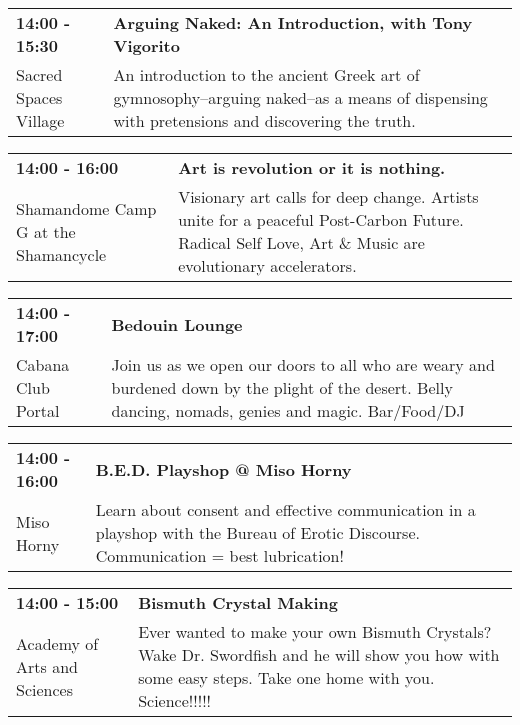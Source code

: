 \begin{tabular}{ p{1in} p{2.2in} }
    \textbf{14:00 - 15:30} & \textbf{Arguing Naked: An Introduction, with Tony Vigorito} \\
    Sacred Spaces Village \newline  & An introduction to the ancient Greek art of gymnosophy--arguing naked--as a means of dispensing with pretensions and discovering the truth. \\
    \hline 
\end{tabular}
    
\begin{tabular}{ p{1in} p{2.2in} }
    \textbf{14:00 - 16:00} & \textbf{Art is revolution or it is nothing.} \\
    Shamandome Camp \newline 615 G at the Shamancycle & Visionary art calls for deep change.  Artists unite for a peaceful Post-Carbon Future. Radical Self Love, Art \& Music are evolutionary accelerators. \\
    \hline 
\end{tabular}
    
\begin{tabular}{ p{1in} p{2.2in} }
    \textbf{14:00 - 17:00} & \textbf{Bedouin Lounge} \\
    Cabana Club \newline 430 Portal & Join us as we open our doors to all who are weary and burdened down by the plight of the desert.  Belly dancing, nomads, genies and magic. Bar/Food/DJ \\
    \hline 
\end{tabular}
    
\begin{tabular}{ p{1in} p{2.2in} }
    \textbf{14:00 - 16:00} & \textbf{B.E.D. Playshop @ Miso Horny} \\
    Miso Horny \newline  & Learn about consent and effective communication in a playshop with the Bureau of Erotic Discourse. Communication = best lubrication! \\
    \hline 
\end{tabular}
    
\begin{tabular}{ p{1in} p{2.2in} }
    \textbf{14:00 - 15:00} & \textbf{Bismuth Crystal Making} \\
    Academy of Arts and Sciences \newline  & Ever wanted to make your own Bismuth Crystals?  Wake Dr. Swordfish and he will show you how with some easy steps. Take one home with you. Science!!!!! \\
    \hline 
\end{tabular}
    
